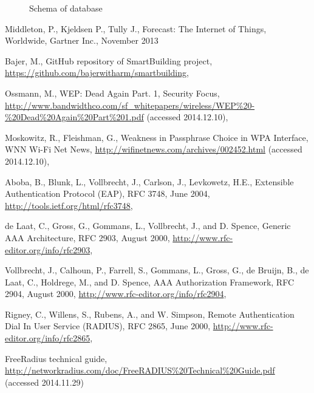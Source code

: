 \documentclass{llncs}
\begin{document}
\begin{figure}
\vspace{-15pt}
\caption{Schema of database}
\end{figure}



%
%
\begin{thebibliography}{}
%
Middleton, P., Kjeldsen P., Tully J., Forecast: The Internet of Things,
Worldwide, Gartner Inc., November 2013

Bajer, M., GitHub repository of SmartBuilding project, 
\url{https://github.com/bajerwitharm/smartbuilding},

Ossmann, M., WEP: Dead Again Part. 1, Security Focus, 
\url{http://www.bandwidthco.com/sf_whitepapers/wireless/WEP%20-%20Dead%20Again%20Part%201.pdf}
(accessed 2014.12.10),

Moskowitz, R., Fleishman, G., Weakness in Passphrase Choice in WPA Interface,
WNN Wi-Fi Net News, 
\url{http://wifinetnews.com/archives/002452.html} (accessed 2014.12.10),

Aboba, B., Blunk, L., Vollbrecht, J., Carlson, J., Levkowetz, H.E., Extensible Authentication Protocol (EAP), RFC 3748, June 2004,
\url{http://tools.ietf.org/html/rfc3748},

de Laat, C., Gross, G., Gommans, L., Vollbrecht, J., and D. Spence, Generic AAA
Architecture, RFC 2903, August 2000,
\url{http://www.rfc-editor.org/info/rfc2903},

Vollbrecht, J., Calhoun, P., Farrell, S., Gommans, L., Gross, G., de Bruijn, B.,
de Laat, C., Holdrege, M., and D. Spence, AAA Authorization Framework, RFC
2904, August 2000, \url{http://www.rfc-editor.org/info/rfc2904},

Rigney, C., Willens, S., Rubens, A., and W. Simpson, Remote  Authentication
Dial In User Service (RADIUS), RFC 2865, June 2000,
\url{http://www.rfc-editor.org/info/rfc2865},

FreeRadius technical guide,
\url{http://networkradius.com/doc/FreeRADIUS%20Technical%20Guide.pdf} (accessed 2014.11.29)

\end{thebibliography}
\end{document}
